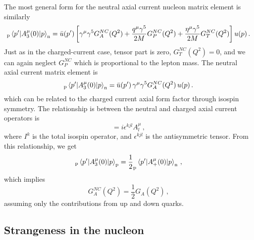     The most general form for the neutral axial current nucleon matrix element
    is similarly
    \begin{equation}
      _{\textrm{p}}\mel{p'}{A^{\mu}_3(0)}{p}_{\textrm{n}} 
        = \bar{u}(p') \left[\gamma^{\mu}\gamma^{5} G_A^{NC}(Q^2) 
          + \frac{q^{\mu}\gamma^{5}}{2M}G_P^{NC}(Q^2) 
          + \frac{\eta^{\mu}\gamma^{5}}{2M}G_T^{NC}(Q^2)\right] u(p) \,.
    \end{equation}
    Just as in the charged-current case, tensor part is zero, $G_T^{NC}(Q^2) =
    0$, and we can again neglect $G_P^{NC}$ which is proportional to the lepton
    mass. The neutral axial current matrix element is
    \begin{equation}
      _{\textrm{p}}\mel{p'}{A^{\mu}_3(0)}{p}_{\textrm{n}} 
        = \bar{u}(p') \,\gamma^{\mu}\gamma^{5} G_A^{NC}(Q^2)\, u(p) \,.
    \end{equation}
    which can be related to the charged current axial form factor through
    isospin symmetry.  The relationship is between the neutral and charged
    axial current operators is
    \begin{equation}
      [I^k,A_j^{\mu}] = i\epsilon^{kjl}A^{\mu}_l \,,
    \end{equation}
    where $I^k$ is the total isospin operator, and $\epsilon^{kjl}$ is the
    antisymmetric tensor. From this relationship, we get
    \begin{equation}
      _{\textrm{p}}\mel{p'}{A^{\mu}_3(0)}{p}_{\textrm{p}}
       = \frac{1}{2}_{\textrm{p}}\mel{p'}{A^{\mu}_+(0)}{p}_{\textrm{n}}\,,
    \end{equation}
    which implies
    \begin{equation}
      G_A^{NC}(Q^2) = \frac{1}{2}G_A(Q^2) \,,
    \end{equation}
    assuming only the contributions from up and down quarks.

\subsection{Strangeness in the nucleon} \label{sec:strangeness}

